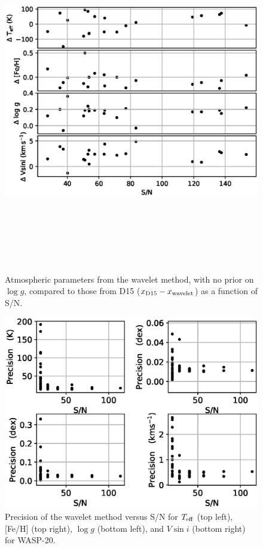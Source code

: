 \begin{figure}[ht!]
\centering
\includegraphics[height=15cm,width=12cm]{5-images/snr1.eps}
\caption{Atmospheric parameters from the wavelet method, with no prior on $\log g$, compared to those from D15 ($x_{\rm D15}-x_{\rm wavelet}$) as a function of S/N.}
\label{wavelet:fig:snr}
\end{figure}

\begin{figure}[ht!]
\centering
\includegraphics[width=\textwidth]{5-images/precision.eps}
\caption{Precision of the wavelet method versus S/N for $T_{\rm eff}$ (top left), [Fe/H] (top right), $\log g$ (bottom left), and $V \sin i$ (bottom right) for WASP-20. }
\label{wavelet:fig:precision}
\end{figure}

